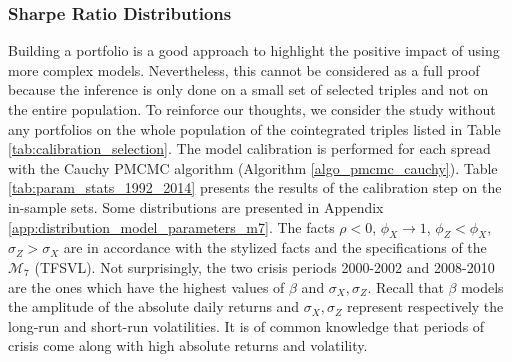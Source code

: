 \documentclass[11pt,a4,twosided,singlespacing,titlepagenumber=on]{scrreprt}
\numberwithin{equation}{chapter} %
\theoremstyle{remark}
\begin{document}
\subsubsection{Sharpe Ratio Distributions}
Building a portfolio is a good approach to highlight the positive impact of using more complex models. Nevertheless, this cannot be considered as a full proof because the inference is only done on a small set of selected triples and not on the entire population. To reinforce our thoughts, we consider the study without any portfolios on the whole population of the cointegrated triples listed in Table \ref{tab:calibration_selection}. The model calibration is performed for each spread with the Cauchy PMCMC algorithm (Algorithm \ref{algo_pmcmc_cauchy}). Table \ref{tab:param_stats_1992_2014} presents the results of the calibration step on the in-sample sets. Some distributions are presented in Appendix \ref{app:distribution_model_parameters_m7}. The facts $\rho < 0$, $\phi_X \rightarrow 1$, $\phi_Z<\phi_X$, $\sigma_Z > \sigma_X$ are in accordance with the stylized facts and the specifications of the $\mathcal{M}_7$ (TFSVL). Not surprisingly, the two crisis periods 2000-2002 and 2008-2010 are the ones which have the highest values of $\beta$ and $\sigma_X, \sigma_Z$. Recall that $\beta$ models the amplitude of the absolute daily returns and $\sigma_X, \sigma_Z$ represent respectively the long-run and short-run volatilities. It is of common knowledge that periods of crisis come along with high absolute returns and volatility.
\end{document}
